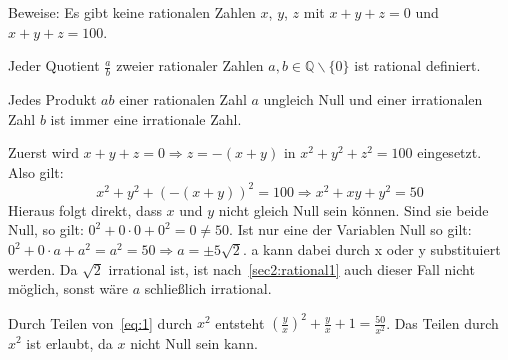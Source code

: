 \documentclass[10pt, a4paper]{amsart}
\makeatletter
\renewenvironment{proof}[1][\proofname]{\par
\pushQED{\qed}%
\normalfont \topsep6\p@\@plus6\p@\relax
\trivlist
\item\relax
{\bfseries#1}\hspace\labelsep\ignorespaces
}{%
\popQED\endtrivlist\@endpefalse
}
\makeatother
\begin{document}
\newpage
\begin{aufgabe}
  Beweise: Es gibt keine rationalen Zahlen $x$, $y$, $z$ mit $x + y + z = 0$ und
  $x + y + z = 100$.
\end{aufgabe}
\begin{lemma}\label{sec2:rational1}
  Jeder Quotient $\frac{a}{b}$ zweier rationaler Zahlen $a,b∈ℚ\backslash\{0\}$
  ist rational definiert.
\end{lemma}
\begin{lemma}\label{sec2:rational2}
  Jedes Produkt $ ab $ einer rationalen Zahl $a$ ungleich Null und einer
  irrationalen Zahl $b$ ist immer eine irrationale Zahl.
\end{lemma}
\begin{proof}
  Zuerst wird $x+y+z = 0 \Rightarrow z = -(x+y)$ in $x^2+y^2+z^2 = 100$
  eingesetzt. Also gilt:
  \begin{equation}
    \label{eq:1}
    x^2+y^2+(-(x+y))^2 = 100 \Rightarrow x^2+xy+y^2=50
  \end{equation}
  Hieraus folgt direkt, dass $x$ und $y$ nicht gleich Null sein können. Sind sie
  beide Null, so gilt: $0^2+0\cdot0+0^2=0\neq50$. Ist nur eine der Variablen
  Null so gilt: $0^2+0\cdot a+a^2=a^2=50\Rightarrow a = \pm5\sqrt{2}$. a kann
  dabei durch x oder y substituiert werden. Da $\sqrt{2}$ irrational ist, ist
  nach~\autoref{sec2:rational1} auch dieser Fall nicht möglich, sonst wäre $a$
  schließlich irrational.

  Durch Teilen von~\eqref{eq:1} durch $x^2$ entsteht
  $(\frac{y}{x})^2+\frac{y}{x}+1=\frac{50}{x^2}$. Das Teilen durch $x^2$ ist
  erlaubt, da $x$ nicht Null sein kann.
  

\end{proof}
\end{document}
